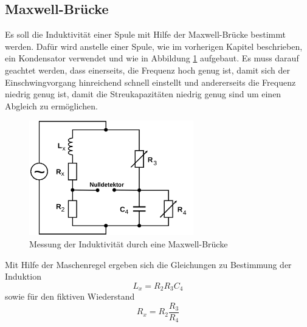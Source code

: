 \subsection{Maxwell-Brücke}
Es soll die Induktivität einer Spule mit Hilfe der Maxwell-Brücke bestimmt werden. Dafür wird anstelle einer Spule, wie im vorherigen Kapitel beschrieben, ein Kondensator verwendet und wie in Abbildung \ref{fig:Max-Br} aufgebaut. Es muss darauf geachtet werden, dass einerseits, die Frequenz hoch genug ist, damit sich der Einschwingvorgang hinreichend schnell einstellt und andererseits die Frequenz niedrig genug ist, damit die Streukapazitäten niedrig genug sind um einen Abgleich zu ermöglichen.
\begin{figure}
  \centering
  \includegraphics[height=5cm]{picture/5.png}
  \caption{Messung der Induktivität durch eine Maxwell-Brücke}
  \label{fig:Max-Br}
\end{figure}
Mit Hilfe der Maschenregel ergeben sich die Gleichungen zu Bestimmung der Induktion
\begin{equation}
  L_x = R_2 R_3 C_4
  \label{eqn:L_m}
\end{equation}
sowie für den fiktiven Wiederstand
\begin{equation*}
  R_x = R_2 \frac{R_3}{R_4}
\end{equation*}


